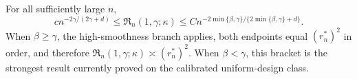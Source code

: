 For all sufficiently large \(n\),
\[
c n^{-2\gamma/(2\gamma+d)}
\le \mathfrak R_n(1,\gamma;\kappa)
\le C n^{-2\min\{\beta,\gamma\}/\{2\min\{\beta,\gamma\}+d\}}.
\]
When \(\beta\ge\gamma\), the high-smoothness branch applies, both endpoints equal \((r_n^*)^2\) in order, and therefore \(\mathfrak R_n(1,\gamma;\kappa)\asymp(r_n^*)^2\). When \(\beta<\gamma\), this bracket is the strongest result currently proved on the calibrated uniform-design class.